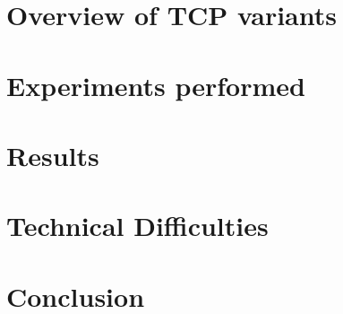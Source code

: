 \documentclass[11pt,a4paper,twocolumn]{article}
\begin{document}
\section{Overview of TCP variants}
\label{sec:tcpoverview}

\section{Experiments performed}
\label{sec:exp}

\section{Results}
\label{sec:results}

\section{Technical Difficulties}
\label{sec:diff}

\section{Conclusion}
\label{sec:conc}




\end{document}
